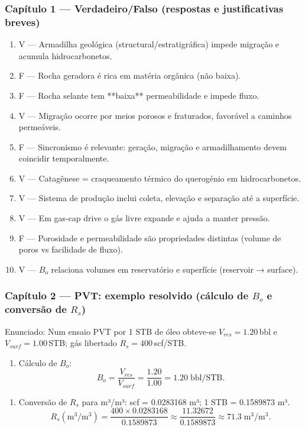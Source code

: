 \documentclass[11pt,a4paper]{article}
\begin{document}
\subsubsection{Capítulo 1 — Verdadeiro/Falso (respostas e justificativas breves)}
\begin{enumerate}
\item V — Armadilha geológica (structural/estratigráfica) impede migração e acumula hidrocarbonetos.
\item F — Rocha geradora é rica em matéria orgânica (não baixa).
\item F — Rocha selante tem **baixa** permeabilidade e impede fluxo.
\item V — Migração ocorre por meios porosos e fraturados, favorável a caminhos permeáveis.
\item F — Sincronismo é relevante: geração, migração e armadilhamento devem coincidir temporalmente.
\item V — Catagênese = craqueamento térmico do querogénio em hidrocarbonetos.
\item V — Sistema de produção inclui coleta, elevação e separação até a superfície.
\item V — Em gas‑cap drive o gás livre expande e ajuda a manter pressão.
\item F — Porosidade e permeabilidade são propriedades distintas (volume de poros vs facilidade de fluxo).
\item V — $B_o$ relaciona volumes em reservatório e superfície (reservoir → surface).
\end{enumerate}

\subsubsection{Capítulo 2 — PVT: exemplo resolvido (cálculo de $B_o$ e conversão de $R_s$)}
Enunciado: Num ensaio PVT por 1 STB de óleo obteve‑se $V_{res}=1.20\,$bbl e $V_{surf}=1.00\,$STB; gás libertado $R_s=400\,$scf/STB.

\begin{enumerate}[label=\Alph*)]
\item Cálculo de $B_o$:\n$$B_o=\dfrac{V_{res}}{V_{surf}}=\dfrac{1.20}{1.00}=1.20\;\text{bbl/STB}.$$ 
\end{enumerate}

\begin{enumerate}[label=\Alph*)]
\item Conversão de $R_s$ para m³/m³: scf = 0.0283168 m³; 1 STB = 0.1589873 m³.
$$R_s(\text{m}^3/\text{m}^3)=\dfrac{400\times0.0283168}{0.1589873}\approx\dfrac{11.32672}{0.1589873}\approx71.3\;\text{m}^3/\text{m}^3.$$ 
\end{enumerate}
\end{document}

